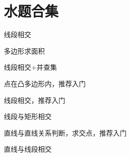 \section{水题合集}

\begin{frame}
\pause
\begin{description}[<+->]
    \item[POJ1066] 线段相交
    \item[POJ1654] 多边形求面积
    \item[POJ1127] 线段相交+并查集
    \item[POJ2318] 点在凸多边形内，推荐入门
    \item[POJ2653] 线段相交，推荐入门
    \item[POJ1410] 线段与矩形相交
    \item[POJ1269] 直线与直线关系判断，求交点，推荐入门
    \item[POJ3304] 直线与线段相交
\end{description}
\end{frame}